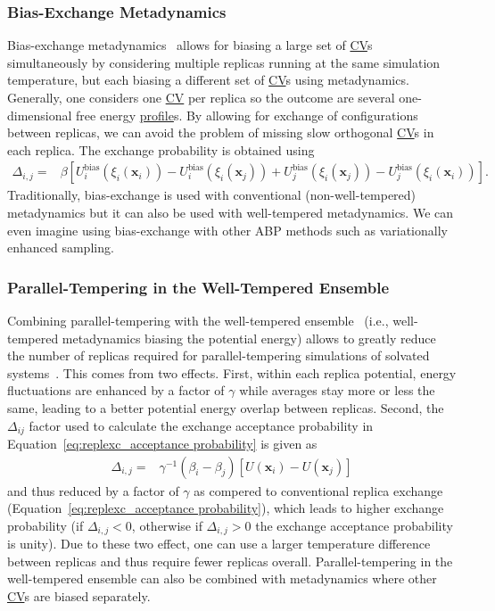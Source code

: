 \documentclass[9pt,review]{livecoms}
\newcommand{\vx}{\mathbf{x}}
\begin{document}
\subsubsection{Bias-Exchange Metadynamics}
\label{sec:be-metad}
Bias-exchange metadynamics~\cite{Piana2007_bemeta} allows for biasing a large set of \hyperlink{ref:CV} {CV}s simultaneously by considering multiple replicas running at the same simulation temperature, but each biasing a different set of \hyperlink{ref:CV} {CV}s using metadynamics. Generally, one considers one \hyperlink{ref:CV} {CV} per replica so the outcome are several one-dimensional free energy \hyperlink{ref:FES} {profile}s. By allowing for exchange of configurations between replicas, we can avoid the problem of missing slow orthogonal \hyperlink{ref:CV} {CV}s in each replica.
The exchange probability is obtained using
\begin{align}
\Delta_{i,j} = &
\beta \left[
U^{\mathrm{bias}}_{i}(\xi_{i}(\vx_{i})) - U^{\mathrm{bias}}_{i}(\xi_{i}(\vx_{j})) +
U^{\mathrm{bias}}_{j}(\xi_{i}(\vx_{j})) - U^{\mathrm{bias}}_{j}(\xi_{i}(\vx_{i}))
\right].
\end{align}
Traditionally, bias-exchange is used with conventional (non-well-tempered) metadynamics but it can also be used with well-tempered metadynamics. We can even imagine using bias-exchange with other ABP methods such as variationally enhanced sampling.
%

\subsubsection{Parallel-Tempering in the Well-Tempered Ensemble}
\label{sec:pt-wte}
Combining parallel-tempering with the well-tempered ensemble~\cite{Bonomi-PRL-2010} (i.e., well-tempered metadynamics biasing the potential energy) allows to greatly reduce the number of replicas required for parallel-tempering simulations of solvated systems~\cite{Deighan2012_ptwte_efficient}. This comes from two effects. First, within each replica potential, energy fluctuations are enhanced by a factor of $\gamma$ while averages stay more or less the same, leading to a better potential energy overlap between replicas. Second, the $\Delta_{ij}$ factor used to calculate the exchange acceptance probability in Equation~\ref{eq:replexc_acceptance probability} is given as
\begin{align}
\Delta_{i,j} = &
\gamma^{-1}
\left(\beta_{i} - \beta_{j}\right)
\left[U(\vx_{i}) - U(\vx_{j})\right]
\end{align}
and thus reduced by a factor of $\gamma$ as compered to conventional replica exchange (Equation~\ref{eq:replexc_acceptance probability}),  which leads to higher exchange probability (if $\Delta_{i,j}<0$, otherwise if $\Delta_{i,j}>0$ the exchange acceptance probability is unity). Due to these two effect, one can use a larger temperature difference between replicas and thus require fewer replicas overall. Parallel-tempering in the well-tempered ensemble can also be combined with metadynamics where other \hyperlink{ref:CV} {CV}s are biased separately.
\end{document}
